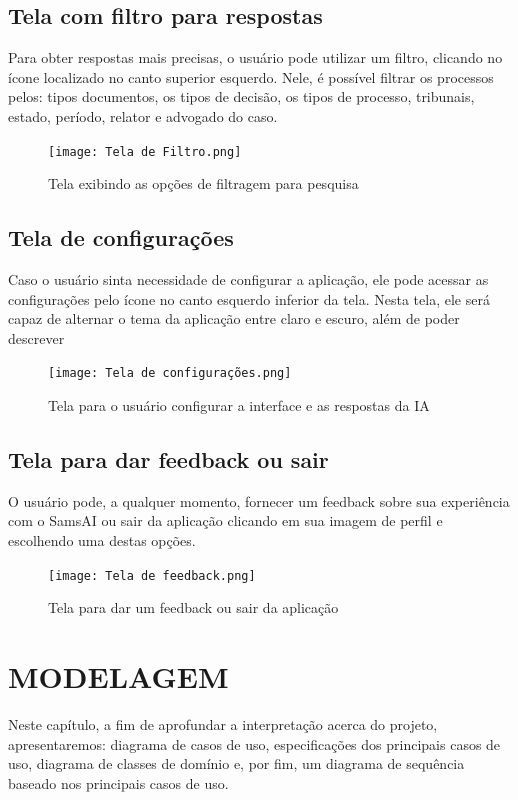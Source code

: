 \documentclass[
	12pt,				%
	openright,			%
	oneside,			    %
	a4paper,				%
	english,			%
	french,			%
	spanish,			%
	brazil			%
	]{abntex2}
\begin{document}
\section{Tela com filtro para respostas}
Para obter respostas mais precisas, o usuário pode utilizar um filtro, clicando no ícone localizado no canto superior esquerdo. Nele, é possível filtrar os processos pelos: tipos documentos, os tipos de decisão, os tipos de processo, tribunais, estado, período, relator e advogado do caso.

\begin{figure}[h]
    \centering
    \texttt{[image: Tela de Filtro.png]}
    \caption{Tela exibindo as opções de filtragem para pesquisa}
    \label{fig:enter-label}
\end{figure}

\newpage
\section{Tela de configurações}
Caso o usuário sinta necessidade de configurar a aplicação, ele pode acessar as configurações pelo ícone no canto esquerdo inferior da tela. Nesta tela, ele será capaz de alternar o tema da aplicação entre claro e escuro, além de poder descrever

\begin{figure}[h!]
    \centering
    \texttt{[image: Tela de configurações.png]}
    \caption{Tela para o usuário configurar a interface e as respostas da IA}
    \label{fig:enter-label}
\end{figure}

\newpage
\section{Tela para dar feedback ou sair}
O usuário pode, a qualquer momento, fornecer um feedback sobre sua experiência com o SamsAI ou sair da aplicação clicando em sua imagem de perfil e escolhendo uma destas opções.

\begin{figure}[h!]
    \centering
    \texttt{[image: Tela de feedback.png]}
    \caption{Tela para dar um feedback ou sair da aplicação}
    \label{fig:enter-label}
\end{figure}



\chapter{MODELAGEM}
Neste capítulo, a fim de aprofundar a interpretação acerca do projeto, apresentaremos: diagrama de casos de uso, especificações dos principais casos de uso, diagrama de classes de domínio e, por fim, um diagrama de sequência baseado nos principais casos de uso.
\end{document}
